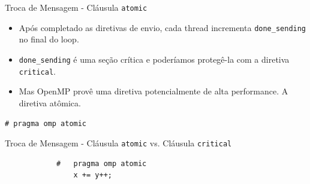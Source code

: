	\begin{frame}{Troca de Mensagem -   Cláusula {\tt atomic}}
		\begin{itemize}
			\item Após completado as diretivas de envio, cada thread incrementa {\tt done\_sending} no final do loop.
			\item {\tt done\_sending} é uma seção crítica e poderíamos protegê-la com a diretiva {\tt critical}.
			\item Mas OpenMP provê uma diretiva potencialmente de alta performance. A diretiva atômica.
		\end{itemize}
		{\tt \#	pragma omp atomic}
	\end{frame}

	\begin{frame}[fragile]{Troca de Mensagem - Cláusula {\tt atomic} vs. Cláusula {\tt critical}}

		\begin{verbatim}
			#	pragma omp atomic
				x += y++;
		\end{verbatim}
\end{frame}

